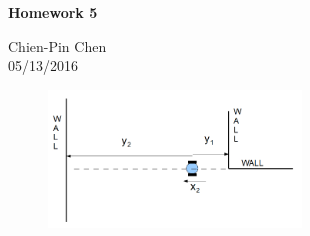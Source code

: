 \documentclass{article}
\begin{document}
 
\begin{center}
{\bf \Large  Homework 5} \\
\end{center}
Chien-Pin Chen\\
05/13/2016

\begin{figure}[h]
\begin{center}
\includegraphics[width=0.6\textwidth]{fig1.jpg}
\end{center}
\end{figure}
\end{document}
